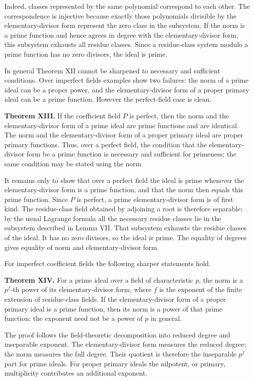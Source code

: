 \documentclass[12pt]{article}
\begin{document}
Indeed, classes represented by the same polynomial correspond to each other. The correspondence is injective because exactly those polynomials divisible by the elementary-divisor form represent the zero class in the subsystem. If the norm is a prime function and hence agrees in degree with the elementary-divisor form, this subsystem exhausts all residue classes. Since a residue-class system modulo a prime function has no zero divisors, the ideal is prime.

In general Theorem XII cannot be sharpened to necessary and sufficient conditions. Over imperfect fields examples show two failures: the norm of a prime ideal can be a proper power, and the elementary-divisor form of a proper primary ideal can be a prime function. However the perfect-field case is clean.

\textbf{Theorem XIII.} If the coefficient field $P$ is perfect, then the norm and the elementary-divisor form of a prime ideal are prime functions and are identical. The norm and the elementary-divisor form of a proper primary ideal are proper primary functions. Thus, over a perfect field, the condition that the elementary-divisor form be a prime function is necessary and sufficient for primeness; the same condition may be stated using the norm.

It remains only to show that over a perfect field the ideal is prime whenever the elementary-divisor form is a prime function, and that the norm then equals this prime function. Since $P$ is perfect, a prime elementary-divisor form is of first kind. The residue-class field obtained by adjoining a root is therefore separable; by the usual Lagrange formula all the necessary residue classes lie in the subsystem described in Lemma VII. That subsystem exhausts the residue classes of the ideal. It has no zero divisors, so the ideal is prime. The equality of degrees gives equality of norm and elementary-divisor form.

For imperfect coefficient fields the following sharper statements hold.

\textbf{Theorem XIV.} For a prime ideal over a field of characteristic $p$, the norm is a $p^f$-th power of its elementary-divisor form, where $f$ is the exponent of the finite extension of residue-class fields. If the elementary-divisor form of a proper primary ideal is a prime function, then its norm is a power of that prime function; the exponent need not be a power of $p$ in general.

The proof follows the field-theoretic decomposition into reduced degree and inseparable exponent. The elementary-divisor form measures the reduced degree; the norm measures the full degree. Their quotient is therefore the inseparable $p^f$ part for prime ideals. For proper primary ideals the nilpotent, or primary, multiplicity contributes an additional exponent.
\end{document}
